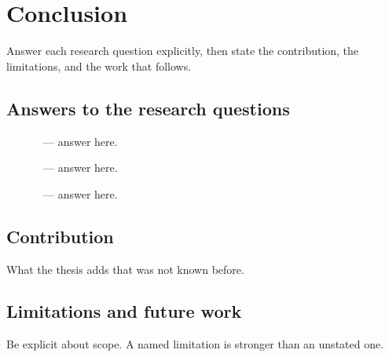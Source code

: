\chapter{Conclusion}
\label{ch:conclusion}

Answer each research question explicitly, then state the contribution,
the limitations, and the work that follows.

\section{Answers to the research questions}

\begin{description}
  \item[] \rqone\ --- answer here.
  \item[] \rqtwo\ --- answer here.
  \item[] \rqthree\ --- answer here.
\end{description}

\section{Contribution}

What the thesis adds that was not known before.

\section{Limitations and future work}

Be explicit about scope. A named limitation is stronger than an unstated one.
